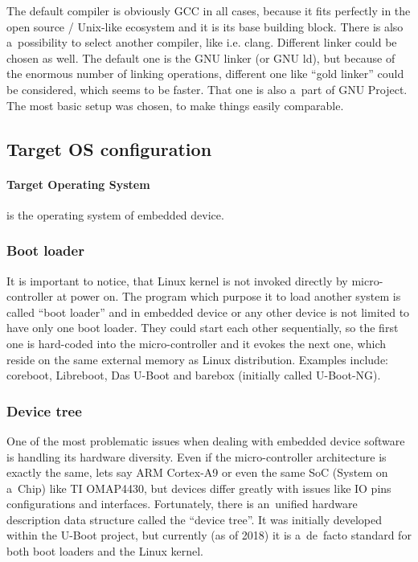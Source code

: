 \documentclass[printmode]{mgr}
\begin{document}
The default compiler is obviously GCC in all cases, because it fits perfectly in the open source / Unix-like ecosystem and it is its base building block.
There is also a~possibility to select another compiler, like i.e. clang. Different linker could be chosen as well.
The default one is the GNU linker (or GNU ld), but because of the enormous number of linking operations, different one like ``gold linker'' could be considered, which seems to be faster.
That one is also a~part of GNU Project.
The most basic setup was chosen, to make things easily comparable.


\subsection{Target OS configuration}

\paragraph{Target Operating System} is the operating system of embedded device.

\subsubsection{Boot loader}
It is important to notice, that Linux kernel is not invoked directly by micro-controller at power on.
The program which purpose it to load another system is called ``boot loader'' and in embedded device or any other device is not limited to have only one boot loader.
They could start each other sequentially, so the first one is hard-coded into the micro-controller and it evokes the next one, which reside on the same external memory as Linux distribution.
Examples include: coreboot, Libreboot, Das U-Boot and barebox (initially called U-Boot-NG).

\subsubsection{Device tree}
One of the most problematic issues when dealing with embedded device software is handling its hardware diversity.
Even if the micro-controller architecture is exactly the same, lets say ARM Cortex-A9 or even the same SoC (System on a~Chip) like TI OMAP4430, but devices differ greatly with issues like IO pins configurations and interfaces.
Fortunately, there is an~unified hardware description data structure called the ``device tree''.
It was initially developed within the U-Boot project, but currently (as of 2018) it is a~de~facto standard for both boot loaders and the Linux kernel.
\end{document}
